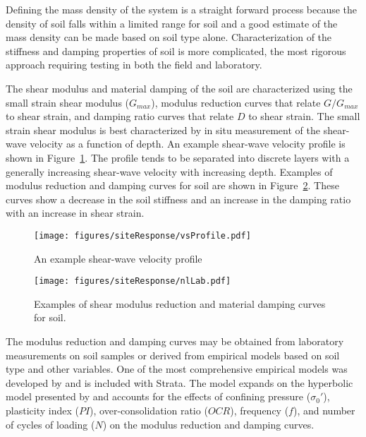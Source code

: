 \documentclass[12pt,oneside]{book}
\begin{document}
Defining the mass density of the system is a straight forward process because the density of soil falls
within a limited range for soil and a good estimate of the mass density can be made based on soil
type alone.  Characterization of the stiffness and damping properties of soil is more complicated,
the most rigorous approach requiring testing in both the field and laboratory.  

The shear modulus and material damping of the soil are characterized using the small strain shear
modulus ($G_{max}$), modulus reduction curves that relate $G/G_{max}$ to shear strain, and damping
ratio curves that relate $D$ to shear strain.  The small strain shear modulus is best
characterized by in situ measurement of the shear-wave velocity as a function of depth.  An example
shear-wave velocity profile is shown in Figure~\ref{fig:siteResponse:vsProfile}. The profile tends to be
separated into discrete layers with a generally increasing shear-wave velocity with increasing
depth.  Examples of modulus reduction and damping curves for soil are shown in
Figure~\ref{fig:siteResponse:nlLab}.  These curves show a decrease in the soil stiffness and an
increase in the damping ratio with an increase in shear strain. 

\begin{figure}[tb]
    \begin{center}
        \texttt{[image: figures/siteResponse/vsProfile.pdf]}
    \end{center}
    \caption{An example shear-wave velocity profile}
    \label{fig:siteResponse:vsProfile}
\end{figure}
\begin{figure}[tb]
    \centering
    \texttt{[image: figures/siteResponse/nlLab.pdf]}
    \caption{Examples of shear modulus reduction and material damping curves for soil.}
    \label{fig:siteResponse:nlLab}
\end{figure}

The modulus reduction and damping curves may be obtained from laboratory measurements on soil
samples or derived from empirical models based on soil type and other variables.  One of the most
comprehensive empirical models was developed by \citet{darendeli:01} and is included with Strata.
The model expands on the hyperbolic model presented by \citet{hardin:72} and accounts for the
effects of confining pressure ($\sigma_0'$), plasticity index ($PI$), over-consolidation ratio
($OCR$), frequency ($f$), and number of cycles of loading ($N$) on the modulus reduction and damping
curves. 
\end{document}
